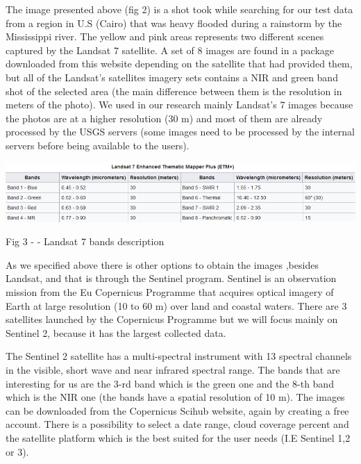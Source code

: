 \documentclass[12pt, a4paper]{report}
\begin{document}
The image presented above (fig 2) is a shot took while searching for our test data from a region in U.S (Cairo) that was heavy flooded during a rainstorm by the Mississippi river. The yellow and pink areas represents two different scenes captured by the Landsat 7 satellite. A set of 8 images are found in a package downloaded from this website depending on the satellite that had provided them, but all of the Landsat's satellites imagery sets contains a NIR and green band shot of the selected area (the main difference between them is the resolution in meters of the photo). We used in our research mainly Landsat's 7 images because the photos are at a higher resolution (30 m) and most of them are already processed by the USGS servers (some images need to be processed by the internal servers before being available to the users).

\includegraphics[scale=0.73, center]{Capture.png} 
\begin{center}
Fig 3 - \cite{Wiki_landsat} - Landsat 7 bands description
\end{center}


\medskip

As we specified above there is other options to obtain the images ,besides Landsat, and that is through the Sentinel program. Sentinel is an observation mission from the Eu Copernicus Programme that acquires optical imagery of Earth at large resolution (10 to 60 m) over land and coastal waters. There are 3 satellites launched by the Copernicus Programme but we will focus mainly on Sentinel 2, because it has the largest collected data. 
\par 

The Sentinel 2 satellite has a multi-spectral instrument with 13 spectral channels in the visible, short wave and near infrared spectral range. The bands that are interesting for us are the 3-rd band which is the green one and the 8-th band which is the NIR one (the bands have a spatial resolution of 10 m). The images  can be downloaded from the Copernicus Scihub website, again by creating a free account. There is a possibility to select a date range, cloud coverage percent and the satellite platform which is the best suited for the user needs (I.E Sentinel 1,2 or 3). 
\par 
\end{document}
